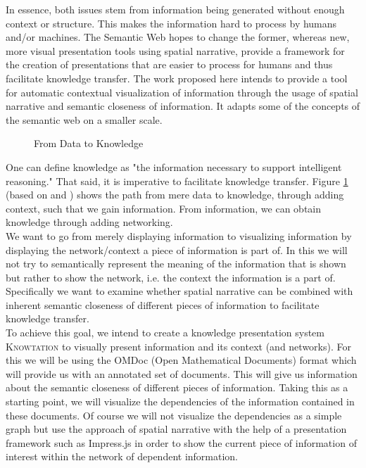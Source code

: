 \documentclass[twoside, 12pt]{article}
\newcommand{\sys}{\textsc{Knowtation}\xspace}
\begin{document}
In essence, both issues stem from information being generated without enough context or structure. This makes the information hard to process by humans and/or machines. The Semantic Web hopes to change the former, whereas new, more visual presentation tools using spatial narrative, provide a framework for the creation of presentations that are easier to process for humans and thus facilitate knowledge transfer. The work proposed here intends to provide a tool for automatic contextual visualization of information through the usage of spatial narrative and semantic closeness of information. It adapts some of the concepts of the semantic web on a smaller scale.\\

\begin{figure}[H]
        \centering
                \caption{From Data to Knowledge}
                \label{fig:dataknow}
\end{figure}

One can define knowledge as "the information necessary to support intelligent reasoning." \cite{Kohlhase:Complog:base} That said, it is imperative to facilitate knowledge transfer. Figure \ref{fig:dataknow} (based on \cite{ProbstRaubRomhardt} and \cite{Kohlhase:Complog:base}) shows the path from mere data to knowledge, through adding context, such that we gain information. From information, we can obtain knowledge through adding networking.\\

We want to go from merely displaying information to visualizing information by displaying the network/context a piece of information is part of. In this we will not try to semantically represent the meaning of the information that is shown but rather to show the network, i.e. the context the information is a part of. Specifically we want to examine whether spatial narrative can be combined with inherent semantic closeness of different pieces of information to facilitate knowledge transfer.\\

To achieve this goal, we intend to create a knowledge presentation system \sys to visually present information and its context (and networks). For this we will be using the OMDoc (Open Mathematical Documents) format which will provide us with an annotated set of documents. This will give us information about the semantic closeness of different pieces of information. Taking this as a starting point, we will visualize the dependencies of the information contained in these documents. Of course we will not visualize the dependencies as a simple graph but use the approach of spatial narrative with the help of a presentation framework such as Impress.js in order to show the current piece of information of interest within the network of dependent information.\\
\end{document}
